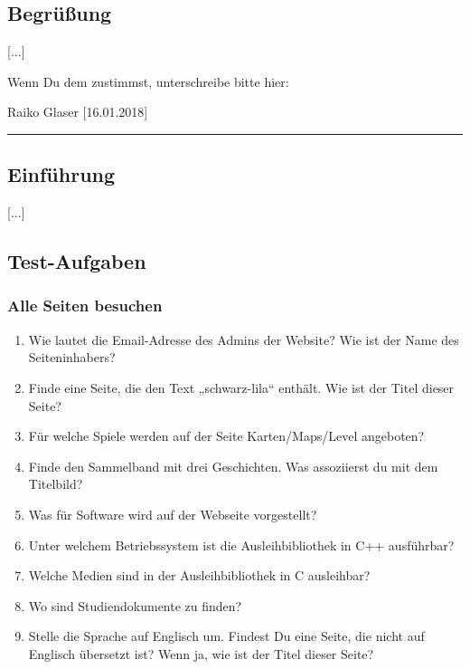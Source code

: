 \subsection*{Begrüßung}
[...]

Wenn Du dem zustimmst, unterschreibe bitte hier:

\vspace*{1em}
Raiko Glaser [16.01.2018]\vspace*{-.9em}\\
\noindent\rule{8cm}{0.4pt}

\subsection*{Einführung}
[...]


\subsection*{Test-Aufgaben}
\subsubsection*{Alle Seiten besuchen}
\begin{enumerate}
\item Wie lautet die Email-Adresse des Admins der Website? Wie ist der Name des Seiteninhabers?
\item Finde eine Seite, die den Text „schwarz-lila“ enthält. Wie ist der Titel dieser Seite?
\item Für welche Spiele werden auf der Seite Karten/Maps/Level angeboten?
\item Finde den Sammelband mit drei Geschichten. Was assoziierst du mit dem Titelbild?
\item Was für Software wird auf der Webseite vorgestellt?
\item Unter welchem Betriebssystem ist die Ausleihbibliothek in C++ ausführbar?
\item Welche Medien sind in der Ausleihbibliothek in C ausleihbar?
\item Wo sind Studiendokumente zu finden?
\item Stelle die Sprache auf Englisch um. Findest Du eine Seite, die nicht auf Englisch übersetzt ist? Wenn ja, wie ist der Titel dieser Seite?
\end{enumerate}


